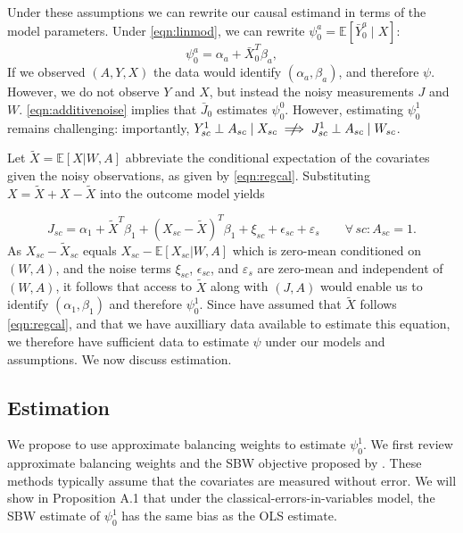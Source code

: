 \documentclass[aoas]{imsart}
\theoremstyle{plain}
\theoremstyle{remark}
\begin{document}
Under these assumptions we can rewrite our causal estimand in terms of the model parameters. Under \eqref{eqn:linmod}, we can rewrite $\psi_0^a = \mathbb{E}[\bar{Y}_0^a \mid X]$:
\begin{equation}\label{eqn:outcome}
\psi_0^a = \alpha_a + \bar{X}_0^T\beta_a,   
\end{equation}
If we observed $(A, Y, X)$ the data would identify $(\alpha_a, \beta_a)$, and therefore $\psi$. However, we do not observe $Y$ and $X$, but instead the noisy measurements $J$ and $W$. \eqref{eqn:additivenoise} implies that $\bar{J}_0$ estimates $\psi_0^0$. However, estimating $\psi_0^1$ remains challenging: importantly, $Y_{sc}^1 \perp A_{sc} \mid X_{sc} \centernot\implies J_{sc}^1 \perp A_{sc} \mid W_{sc}$. 

Let $\tilde{X} = \mathbb{E}[X |W, A]$ abbreviate the conditional expectation of the covariates given the noisy observations, as given by \eqref{eqn:regcal}. Substituting $X = \tilde{X} + X - \tilde{X}$ into the outcome model yields

\begin{equation} \label{eqn:JXtilde}
    J_{sc} = \alpha_1 + \tilde{X}^T\beta_1 + (X_{sc} - \tilde{X})^T\beta_1 + \xi_{sc} + \epsilon_{sc} + \varepsilon_s \qquad\forall\, sc: A_{sc} = 1.
\end{equation}
As $X_{sc} - \tilde{X}_{sc}$ equals $X_{sc} - \mathbb{E}[X_{sc}|W,A]$ which is zero-mean conditioned on $(W,A)$, and the noise terms $\xi_{sc}$, $\epsilon_{sc}$, and $\varepsilon_s$ are zero-mean and independent of $(W, A)$, it follows that access to $\tilde{X}$ along with $(J,A)$  would enable us to identify $(\alpha_1, \beta_1)$ and therefore $\psi_0^1$. Since have assumed that $\tilde{X}$ follows \eqref{eqn:regcal}, and that we have auxilliary data available to estimate this equation, we therefore have sufficient data to estimate $\psi$ under our models and assumptions. We now discuss estimation.

\subsection{Estimation}\label{ssec:estimation}

We propose to use approximate balancing weights to estimate $\psi_0^1$. We first review approximate balancing weights and the SBW objective proposed by \cite{zubizarreta2015stable}. These methods typically assume that the covariates are measured without error. We will show in Proposition A.1 that under the classical-errors-in-variables model, the SBW estimate of $\psi_0^1$ has the same bias as the OLS estimate. 
\end{document}
